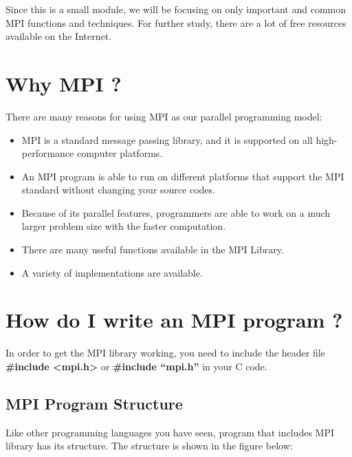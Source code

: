 \documentclass[letterpaper,10pt,openany,oneside]{sphinxmanual}
\begin{document}
Since this is a small module, we will be focusing on only important and common MPI functions and techniques. For further study, there are a lot of free resources available on the Internet.


\section{Why MPI ?}
\label{introMPI/introMPI:why-mpi}
There are many reasons for using MPI as our parallel programming model:
\begin{itemize}
\item {} 
MPI is a standard message passing library, and it is supported on all high-performance computer platforms.

\item {} 
An MPI program is able to run on different platforms that support the MPI standard without changing your source codes.

\item {} 
Because of its parallel features, programmers are able to work on a much larger problem size with the faster computation.

\item {} 
There are many useful functions available in the MPI Library.

\item {} 
A variety of implementations are available.

\end{itemize}


\section{How do I write an MPI program ?}
\label{introMPI/introMPI:how-do-i-write-an-mpi-program}
In order to get the MPI library working, you need to include the header file \textbf{\#include \textless{}mpi.h\textgreater{}} or \textbf{\#include “mpi.h”} in your C code.


\subsection{MPI Program Structure}
\label{introMPI/introMPI:mpi-program-structure}
Like other programming languages you have seen, program that includes MPI library has its structure. The structure is shown in the figure below:
\end{document}
